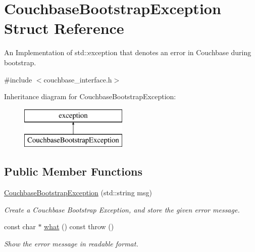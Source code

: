 \hypertarget{structCouchbaseBootstrapException}{\section{Couchbase\-Bootstrap\-Exception Struct Reference}
\label{structCouchbaseBootstrapException}
}


An Implementation of std\-::exception that denotes an error in Couchbase during bootstrap.  




{\ttfamily \#include $<$couchbase\-\_\-interface.\-h$>$}

Inheritance diagram for Couchbase\-Bootstrap\-Exception\-:\begin{figure}[H]
\begin{center}
\leavevmode
\includegraphics[height=2.000000cm]{structCouchbaseBootstrapException}
\end{center}
\end{figure}
\subsection*{Public Member Functions}
\begin{DoxyCompactItemize}
\item 
\hypertarget{structCouchbaseBootstrapException_a6e08bb0106a77ecb072794b243e52f17}{\hyperlink{structCouchbaseBootstrapException_a6e08bb0106a77ecb072794b243e52f17}{Couchbase\-Bootstrap\-Exception} (std\-::string msg)}\label{structCouchbaseBootstrapException_a6e08bb0106a77ecb072794b243e52f17}

\begin{DoxyCompactList}\small\item\em Create a Couchbase Bootstrap Exception, and store the given error message. \end{DoxyCompactList}\item 
\hypertarget{structCouchbaseBootstrapException_a44f1e8eb8cff88cddc27068175db958e}{const char $\ast$ \hyperlink{structCouchbaseBootstrapException_a44f1e8eb8cff88cddc27068175db958e}{what} () const   throw ()}\label{structCouchbaseBootstrapException_a44f1e8eb8cff88cddc27068175db958e}

\begin{DoxyCompactList}\small\item\em Show the error message in readable format. \end{DoxyCompactList}\end{DoxyCompactItemize}
